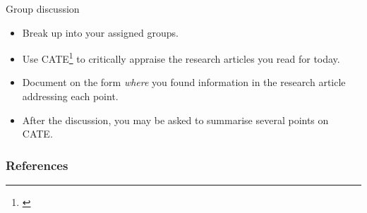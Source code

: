 \documentclass{beamer}
\begin{document}
% 
\begin{frame}{Group discussion}
	\begin{itemize}
	\item Break up into your assigned groups.
	\item Use CATE\footnote{\tiny{\citet[p. 153]{Dollaghan2007}}} to critically appraise the research articles you read for today.
	\item Document on the form \emph{where} you found information in the research article addressing each point.
	\item After the discussion, you may be asked to summarise several points on CATE.
	\end{itemize}
\end{frame}

%
\begin{frame}%
	\frametitle{References}
	
	\small
\end{frame}
\end{document}
